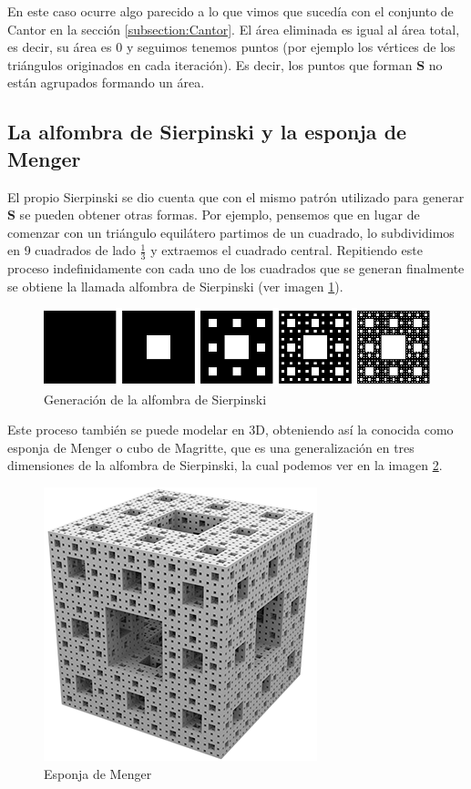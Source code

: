 En este caso ocurre algo parecido a lo que vimos que sucedía con el conjunto de Cantor en la sección \ref{subsection:Cantor}. El área eliminada es igual al área total, es decir, su área es 0 y seguimos tenemos puntos (por ejemplo los vértices de los triángulos originados en cada iteración). Es decir, los puntos que forman \textbf{S} no están agrupados formando un área.

\subsection{La alfombra de Sierpinski y la esponja de Menger}
\label{subsection:alfombra-esponja}

El propio Sierpinski se dio cuenta que con el mismo patrón utilizado para generar \textbf{S} se pueden obtener otras formas. Por ejemplo, pensemos que en lugar de comenzar con un triángulo equilátero partimos de un cuadrado, lo subdividimos en 9 cuadrados de lado $\frac 1 3$ y extraemos el cuadrado central. Repitiendo este proceso indefinidamente con cada uno de los cuadrados que se generan finalmente se obtiene la llamada alfombra de Sierpinski (ver imagen \ref{fig:alfombra-Sierpinski}).

\begin{figure} [ht]
\centering
\includegraphics[scale = 0.6]{img/Sierpinski-carpet.png}
\caption{Generación de la alfombra de Sierpinski}
 \label{fig:alfombra-Sierpinski}
\end{figure}

Este proceso también se puede modelar en 3D, obteniendo así la conocida como esponja de Menger o cubo de Magritte, que es una generalización en tres dimensiones de la alfombra de Sierpinski, la cual podemos ver en la imagen \ref{fig:esponja-menger}.

\begin{figure} [ht]
\centering
\includegraphics[scale = 0.6]{img/esponja_menger.png}
\caption{Esponja de Menger}
 \label{fig:esponja-menger}
\end{figure}

